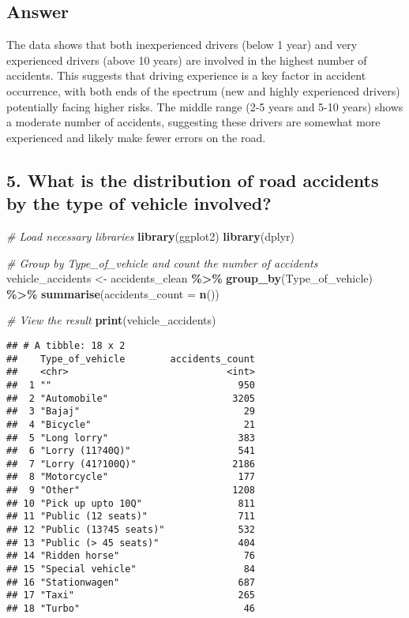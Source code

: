 \documentclass[
]{article}
\newenvironment{Shaded}{\begin{snugshade}}{\end{snugshade}}
\newcommand{\AttributeTok}[1]{\textcolor[rgb]{0.13,0.29,0.53}{#1}}
\newcommand{\CommentTok}[1]{\textcolor[rgb]{0.56,0.35,0.01}{\textit{#1}}}
\newcommand{\FunctionTok}[1]{\textcolor[rgb]{0.13,0.29,0.53}{\textbf{#1}}}
\newcommand{\NormalTok}[1]{#1}
\newcommand{\OtherTok}[1]{\textcolor[rgb]{0.56,0.35,0.01}{#1}}
\newcommand{\SpecialCharTok}[1]{\textcolor[rgb]{0.81,0.36,0.00}{\textbf{#1}}}
\begin{document}
\hypertarget{answer-2}{%
\subsection{Answer}\label{answer-2}}

The data shows that both inexperienced drivers (below 1 year) and very
experienced drivers (above 10 years) are involved in the highest number
of accidents. This suggests that driving experience is a key factor in
accident occurrence, with both ends of the spectrum (new and highly
experienced drivers) potentially facing higher risks. The middle range
(2-5 years and 5-10 years) shows a moderate number of accidents,
suggesting these drivers are somewhat more experienced and likely make
fewer errors on the road.

\hypertarget{what-is-the-distribution-of-road-accidents-by-the-type-of-vehicle-involved}{%
\subsection{5. What is the distribution of road accidents by the type of
vehicle
involved?}\label{what-is-the-distribution-of-road-accidents-by-the-type-of-vehicle-involved}}

\begin{Shaded}
\begin{Highlighting}[]
\CommentTok{\# Load necessary libraries}
\FunctionTok{library}\NormalTok{(ggplot2)}
\FunctionTok{library}\NormalTok{(dplyr)}

\CommentTok{\# Group by \textquotesingle{}Type\_of\_vehicle\textquotesingle{} and count the number of accidents}
\NormalTok{vehicle\_accidents }\OtherTok{\textless{}{-}}\NormalTok{ accidents\_clean }\SpecialCharTok{\%\textgreater{}\%}
  \FunctionTok{group\_by}\NormalTok{(Type\_of\_vehicle) }\SpecialCharTok{\%\textgreater{}\%}
  \FunctionTok{summarise}\NormalTok{(}\AttributeTok{accidents\_count =} \FunctionTok{n}\NormalTok{())}

\CommentTok{\# View the result}
\FunctionTok{print}\NormalTok{(vehicle\_accidents)}
\end{Highlighting}
\end{Shaded}

\begin{verbatim}
## # A tibble: 18 x 2
##    Type_of_vehicle        accidents_count
##    <chr>                            <int>
##  1 ""                                 950
##  2 "Automobile"                      3205
##  3 "Bajaj"                             29
##  4 "Bicycle"                           21
##  5 "Long lorry"                       383
##  6 "Lorry (11?40Q)"                   541
##  7 "Lorry (41?100Q)"                 2186
##  8 "Motorcycle"                       177
##  9 "Other"                           1208
## 10 "Pick up upto 10Q"                 811
## 11 "Public (12 seats)"                711
## 12 "Public (13?45 seats)"             532
## 13 "Public (> 45 seats)"              404
## 14 "Ridden horse"                      76
## 15 "Special vehicle"                   84
## 16 "Stationwagen"                     687
## 17 "Taxi"                             265
## 18 "Turbo"                             46
\end{verbatim}
\end{document}
